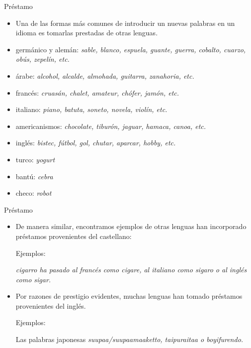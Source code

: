 \documentclass{beamer}
\begin{document}
\begin{frame}{Préstamo}

\begin{itemize}
    \item Una de las formas más comunes de introducir un nuevas palabras en un idioma es tomarlas prestadas de otras lenguas.
    
    \item germánico y alemán: \it{sable, blanco, espuela, guante, guerra, cobalto, cuarzo, obús, zepelín}, etc.

    \item árabe: \it{alcohol, alcalde, almohada, guitarra, zanahoria}, etc.
    
    \item francés: \it{cruasán, chalet, amateur, chófer, jamón}, etc.
    
    \item italiano: \it{piano, batuta, soneto, novela, violín}, etc.

    \item americanismos: \it{chocolate, tiburón, jaguar, hamaca, canoa}, etc.

    \item inglés: \it{bistec, fútbol, gol, chutar, aparcar, hobby}, etc.

    \item turco: \it{yogurt}
    
    \item bantú: \it{cebra}
    
    \item checo: \it{robot}
\end{itemize}

\end{frame}

\begin{frame}{Préstamo}

\begin{itemize}
    \item De manera similar, encontramos ejemplos de otras lenguas han incorporado préstamos provenientes del castellano:
    
    Ejemplos: 
    
    \it{cigarro} ha pasado al francés como \it{cigare}, al italiano como \it{sigaro} o al inglés como \it{sigar}.
    
    \item Por razones de prestigio evidentes, muchas lenguas han tomado préstamos provenientes del inglés.
    
    Ejemplos: 
    
    Las palabras japonesas \it{suupaa}/\it{suupaamaaketto}, \it{taipuraitaa} o \it{boyifurendo}. 
\end{itemize}



\end{frame}
\end{document}
